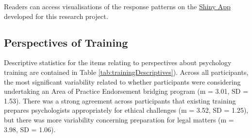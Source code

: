 \documentclass[
  english,
  man]{apa6}
\begin{document}
Readers can access visualisations of the response patterns on the \href{https://jakekraska.shinyapps.io/psychtraining/}{Shiny App} developed for this research project.

\hypertarget{perspectives-of-training}{%
\subsection{Perspectives of Training}\label{perspectives-of-training}}

Descriptive statistics for the items relating to perspectives about psychology training are contained in Table \ref{tab:trainingDescriptives}). Across all participants, the most significant variability related to whether participants were considering undertaking an Area of Practice Endorsement bridging program (m = 3.01, SD = 1.53). There was a strong agreement across participants that existing training prepares psychologists appropriately for ethical challenges (m = 3.52, SD = 1.25), but there was more variability concerning preparation for legal matters (m = 3.98, SD = 1.06).
\end{document}
